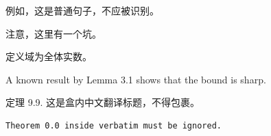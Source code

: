 \documentclass{elegantbook}
\begin{document}
例如，这是普通句子，不应被识别。

注意，这里有一个坑。

定义域为全体实数。

A known result by Lemma 3.1 shows that the bound is sharp.

\begin{tcolorbox}
定理 9.9. 这是盒内中文翻译标题，不得包裹。
\end{tcolorbox}

\begin{verbatim}
Theorem 0.0 inside verbatim must be ignored.
\end{verbatim}
\end{document}
